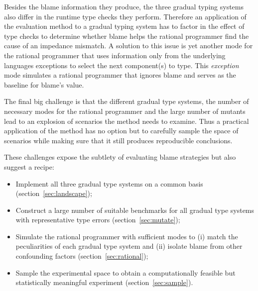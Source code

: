 Besides the blame information they produce, the three gradual typing
systems also differ in the runtime type checks they perform. Therefore an
application of the evaluation method to a gradual typing system has to
factor in the effect of type checks to determine whether blame helps the
rational programmer find the cause of an impedance mismatch. A solution to this issue
is yet another mode for the rational programmer that uses information only
from the underlying languages exceptions to select the next component(s) to type.
This \emph{exception} mode simulates a rational programmer that ignores
blame and serves as the baseline for blame's value.


The final big challenge is that the different gradual type
systems, the number of necessary modes for the rational programmer
and the large number of mutants lead to an explosion of scenarios the
method needs to examine. Thus a practical application of the
method has no option but to carefully sample the space of scenarios while 
making sure that it still produces reproducible conclusions.


\smallskip

These challenges expose the subtlety of evaluating blame strategies but
also suggest a recipe:


\begin{itemize}

\item Implement all three gradual type systems on a common
  basis (section~\ref{sec:landscape});

\item Construct a large number of suitable benchmarks for all gradual type
  systems with representative
  type errors  (section~\ref{sec:mutate}); 
    
\item Simulate the rational programmer with sufficient 
  modes to (i) match the peculiarities of each gradual type system and 
    (ii) isolate blame from other confounding factors
    (section~\ref{sec:rational});



\item Sample the experimental space  to obtain a computationally feasible
  but statistically meaningful experiment (section~\ref{sec:sample}).

\end{itemize}
